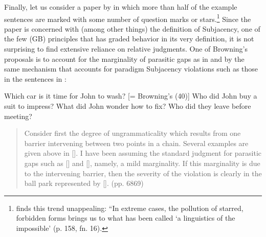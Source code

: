 Finally, let us consider a paper by \citet{Browning1987} in which more than half of the example sentences are marked with some number of question marks or stars.\footnote{\citet{Hagege1981} finds this trend unappealing: ``In extreme cases, the pollution of starred, forbidden forms brings us to what has been called `a linguistics of the impossible'{\textquotedbl} (p. 158, fn. 16).}
 Since the paper is concerned with (among other things) the definition of Subjacency, one of the few  (GB) principles that has graded
behavior in its very definition, it is not surprising to find extensive reliance on relative judgments. One of Browning's proposals is to account for the marginality of parasitic gaps as in  and  by the same mechanism that accounts for paradigm Subjacency violations such as those in the sentences in :


\label{ex:2:11}
   \z

    
\label{ex:2:12}
\z

\ea \label{ex:2:13}
\ea
Which car is it time for John to wash? [= Browning's (40)]
\ex Who did John buy a suit to impress?
\ex What did John wonder how to fix?
\ex Who did they leave before meeting?\\
\z
\z

\begin{quote}
Consider first the degree of ungrammaticality which results from one barrier intervening between two points in a chain. Several examples are given above in []. I have been assuming the standard judgment for parasitic gaps such as [] and [], namely, a mild marginality. If this marginality is due to the intervening barrier, then the severity of the violation is clearly in the ball park represented by []. (pp. 68\textendash{}69)
\end{quote}

